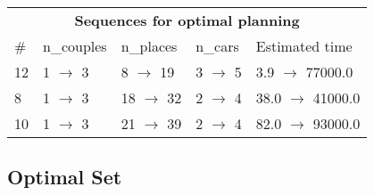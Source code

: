 \documentclass{article}
\begin{document}
                            \begin{center}
                            \begin{tabular}{@{}l|l|l|l|l@{}}
                            \multicolumn{5}{c}{\bf \large Sequences for optimal planning}\\
                            \# & n\_couples & n\_places & n\_cars & Estimated time\\\midrule
                            12&1 $\rightarrow$ 3&8 $\rightarrow$ 19&3 $\rightarrow$ 5&3.9 $\rightarrow$ 77000.0\\
8&1 $\rightarrow$ 3&18 $\rightarrow$ 32&2 $\rightarrow$ 4&38.0 $\rightarrow$ 41000.0\\
10&1 $\rightarrow$ 3&21 $\rightarrow$ 39&2 $\rightarrow$ 4&82.0 $\rightarrow$ 93000.0
                            \end{tabular}
                            \end{center}
                    
                                \subsection*{Optimal Set}
                                
\end{document}
